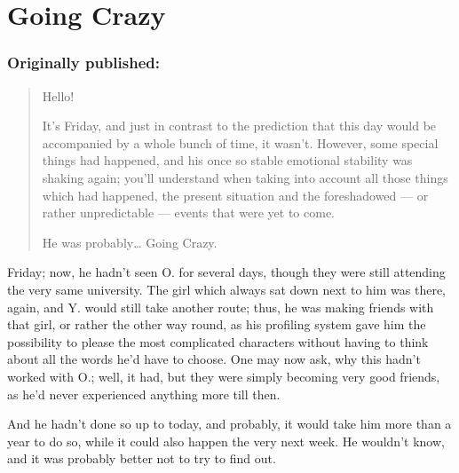 \chapter{Going Crazy}
\label{cha:going-crazy}
\subsection*{Originally published: }
\begin{quote}
Hello!

It's Friday, and just in contrast to the prediction that this day would be accompanied by a whole bunch of time, it wasn't. However, some special things had happened, and his once so stable emotional stability was shaking again; you'll understand when taking into account all those things which had happened, the present situation and the foreshadowed --- or rather unpredictable --- events that were yet to come. 

He was probably\dots{} Going Crazy.
\end{quote}

Friday; now, he hadn't seen O. for several days, though they were still attending the very same university. The girl which always sat down next to him was there, again, and Y. would still take another route; thus, he was making friends with that girl, or rather the other way round, as his profiling system gave him the possibility to please the most complicated characters without having to think about all the words he'd have to choose. One may now ask, why this hadn't worked with O.; well, it had, but they were simply becoming very good friends, as he'd never experienced anything more till then.

And he hadn't done so up to today, and probably, it would take him more than a year to do so, while it could also happen the very next week. He wouldn't know, and it was probably better not to try to find out.


